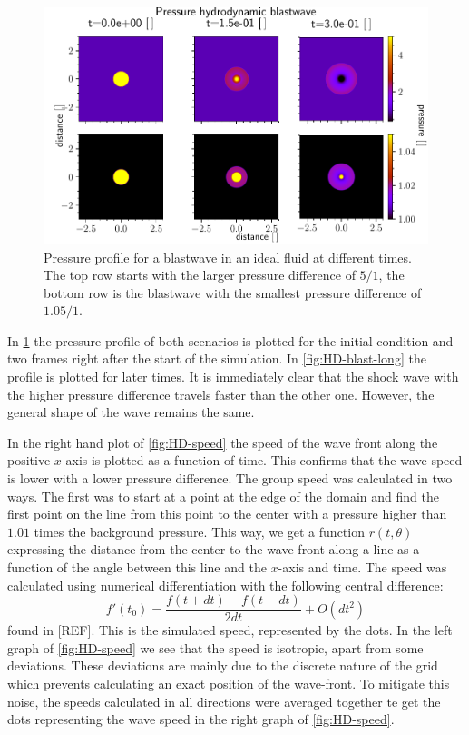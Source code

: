 \begin{figure}[H]
	\centering
	\includegraphics[width=\linewidth]{images/HD-blast-prs-1.pdf}
	\caption{Pressure profile for a blastwave in an ideal fluid at different times. The top row starts with the larger pressure difference of $5/1$, the bottom row is the blastwave with the smallest pressure difference of $1.05/1$.}
	\label{fig:HD-blast-short}
\end{figure}

In \cref{fig:HD-blast-short} the pressure profile of both scenarios is plotted for the initial condition and two frames right after the start of the simulation.
In \cref{fig:HD-blast-long} the profile is plotted for later times.
It is immediately clear that the shock wave with the higher pressure difference travels faster than the other one. However, the general shape of the wave remains the same.


In the right hand plot of \cref{fig:HD-speed} the speed of the wave front along the positive $x$-axis is plotted as a function of time. This confirms that the wave speed is lower with a lower pressure difference.
The group speed was calculated in two ways. 
The first was to start at a point at the edge of the domain and find the first point on the line from this point to the center with a pressure higher than $1.01$ times the background pressure.
This way, we get a function $r(t,\theta)$ expressing the distance from the center to the wave front along a line as a function of the angle between this line and the $x$-axis and time.
The speed was calculated using numerical differentiation with the following central difference:
\begin{equation*}
	f'(t_0) = \frac{f(t+dt)-f(t-dt)}{2dt} + O(dt^2)
\end{equation*}
found in [REF]. This is the simulated speed, represented by the dots.
In the left graph of \cref{fig:HD-speed} we see that the speed is isotropic, apart from some deviations.
These deviations are mainly due to the discrete nature of the grid which prevents calculating an exact position of the wave-front.
To mitigate this noise, the speeds calculated in all directions were averaged together te get the dots representing the wave speed in the right graph of \cref{fig:HD-speed}.

